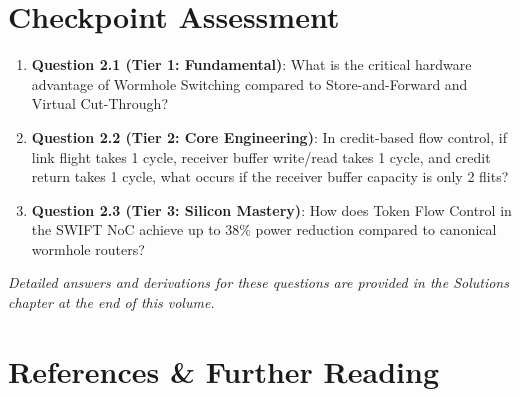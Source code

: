 \section{Checkpoint Assessment}
\label{sec:ch2_assessment}

\begin{enumerate}
    \item \textbf{Question 2.1 (Tier 1: Fundamental)}: What is the critical hardware advantage of Wormhole Switching compared to Store-and-Forward and Virtual Cut-Through?
    \item \textbf{Question 2.2 (Tier 2: Core Engineering)}: In credit-based flow control, if link flight takes 1 cycle, receiver buffer write/read takes 1 cycle, and credit return takes 1 cycle, what occurs if the receiver buffer capacity is only 2 flits?
    \item \textbf{Question 2.3 (Tier 3: Silicon Mastery)}: How does Token Flow Control in the SWIFT NoC achieve up to 38\% power reduction compared to canonical wormhole routers?
\end{enumerate}
\emph{Detailed answers and derivations for these questions are provided in the Solutions chapter at the end of this volume.}

\section{References \& Further Reading}
\label{sec:ch2_references}

